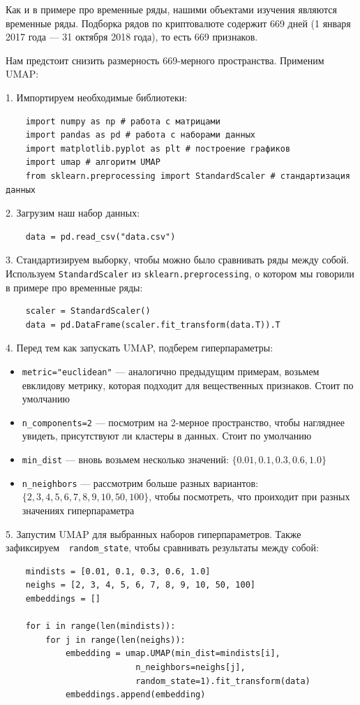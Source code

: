 \graphicspath{{chapters/cryptocurrency/}}
Как и в примере про временные ряды, нашими объектами изучения являются временные ряды. Подборка рядов по криптовалюте содержит 669 дней (1 января 2017 года --- 31 октября 2018 года), то есть 669 признаков.

Нам предстоит снизить размерность 669-мерного пространства. Применим UMAP:

1. Импортируем необходимые библиотеки:

\begin{verbatim}
	import numpy as np # работа с матрицами
	import pandas as pd # работа с наборами данных
	import matplotlib.pyplot as plt # построение графиков
	import umap # алгоритм UMAP
	from sklearn.preprocessing import StandardScaler # стандартизация данных
\end{verbatim}

2. Загрузим наш набор данных:
\begin{verbatim}
	data = pd.read_csv("data.csv")
\end{verbatim}

3. Стандартизируем выборку, чтобы можно было сравнивать ряды между собой. Используем \verb|StandardScaler| из \verb|sklearn.preprocessing|, о котором мы говорили в примере про временные ряды:
\begin{verbatim}
	scaler = StandardScaler()
	data = pd.DataFrame(scaler.fit_transform(data.T)).T
\end{verbatim}

4. Перед тем как запускать UMAP, подберем гиперпараметры:
\begin{itemize}
	\item \verb|metric="euclidean"| --- аналогично предыдущим примерам, возьмем евклидову метрику, которая подходит для вещественных признаков. Стоит по умолчанию
	\item \verb|n_components=2| --- посмотрим на 2-мерное пространство, чтобы нагляднее увидеть, присутствуют ли кластеры в данных. Стоит по умолчанию
	\item \verb|min_dist| --- вновь возьмем несколько значений: $\{0.01, 0.1, 0.3, 0.6, 1.0\}$
	\item \verb|n_neighbors| --- рассмотрим больше разных вариантов: $\{2, 3, 4, 5, 6, 7, 8, 9, 10, 50, 100\}$, чтобы посмотреть, что проиходит при разных значениях гиперпараметра
\end{itemize}

5. Запустим UMAP для выбранных наборов гиперпараметров. Также зафиксируем $\;$ \verb|random_state|, чтобы сравнивать результаты между собой:
\begin{verbatim}
	mindists = [0.01, 0.1, 0.3, 0.6, 1.0]
	neighs = [2, 3, 4, 5, 6, 7, 8, 9, 10, 50, 100]
	embeddings = []
	
	for i in range(len(mindists)):
		for j in range(len(neighs)):
			embedding = umap.UMAP(min_dist=mindists[i],
					      n_neighbors=neighs[j],
					      random_state=1).fit_transform(data)
			embeddings.append(embedding)
\end{verbatim}


